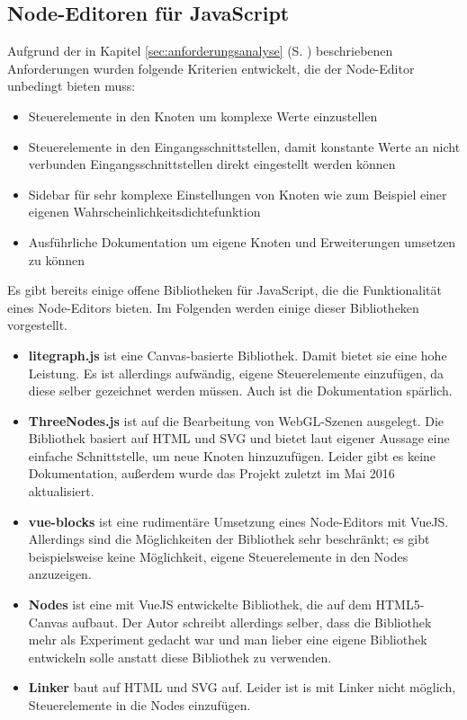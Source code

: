 \subsection{Node-Editoren für JavaScript}

Aufgrund der in Kapitel \ref{sec:anforderungsanalyse} (S. \pageref{sec:anforderungsanalyse}) beschriebenen Anforderungen wurden folgende Kriterien entwickelt, die der Node-Editor unbedingt bieten muss:
\begin{itemize}
    \item Steuerelemente in den Knoten um komplexe Werte einzustellen
    \item Steuerelemente in den Eingangsschnittstellen, damit konstante Werte an nicht verbunden Eingangsschnittstellen direkt eingestellt werden können
    \item Sidebar für sehr komplexe Einstellungen von Knoten wie zum Beispiel einer eigenen Wahrscheinlichkeitsdichtefunktion
    \item Ausführliche Dokumentation um eigene Knoten und Erweiterungen umsetzen zu können
\end{itemize}

Es gibt bereits einige offene Bibliotheken für JavaScript, die die Funktionalität eines Node-Editors bieten. Im Folgenden werden einige dieser Bibliotheken vorgestellt.

\begin{itemize}
    \item \textbf{litegraph.js} ist eine Canvas-basierte Bibliothek. Damit bietet sie eine hohe Leistung. Es ist allerdings aufwändig, eigene Steuerelemente einzufügen, da diese selber gezeichnet werden müssen. Auch ist die Dokumentation spärlich. \cite{litegraph}
    \item \textbf{ThreeNodes.js} ist auf die Bearbeitung von WebGL-Szenen ausgelegt. Die Bibliothek basiert auf HTML und SVG und bietet laut eigener Aussage eine einfache Schnittstelle, um neue Knoten hinzuzufügen. Leider gibt es keine Dokumentation, außerdem wurde das Projekt zuletzt im Mai 2016 aktualisiert. \cite{threenodes}
    \item \textbf{vue-blocks} ist eine rudimentäre Umsetzung eines Node-Editors mit VueJS. Allerdings sind die Möglichkeiten der Bibliothek sehr beschränkt; es gibt beispielsweise keine Möglichkeit, eigene Steuerelemente in den Nodes anzuzeigen. \cite{vueblocks}
    \item \textbf{Nodes} ist eine mit VueJS entwickelte Bibliothek, die auf dem HTML5-Canvas aufbaut. Der Autor schreibt allerdings selber, dass die Bibliothek mehr als Experiment gedacht war und man lieber eine eigene Bibliothek entwickeln solle anstatt diese Bibliothek zu verwenden. \cite{nodes}
    \item \textbf{Linker} baut auf HTML und SVG auf. Leider ist is mit Linker nicht möglich, Steuerelemente in die Nodes einzufügen. \cite{linker}
\end{itemize}

